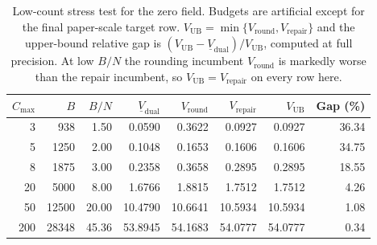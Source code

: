 \begin{table}[t]\centering\small
\caption{Low-count stress test for the zero field. Budgets are artificial except
for the final paper-scale target row. $V_{\mathrm{UB}}=\min\{V_{\mathrm{round}},
V_{\mathrm{repair}}\}$ and the upper-bound relative gap is
$(V_{\mathrm{UB}}-\underline V_{\mathrm{dual}})/V_{\mathrm{UB}}$, computed at full
precision. At low $B/N$ the rounding incumbent $V_{\mathrm{round}}$ is markedly
worse than the repair incumbent, so $V_{\mathrm{UB}}=V_{\mathrm{repair}}$ on every
row here.}
\label{tab:cmax-ablation}
\begin{tabular}{rrrrrrrr}
\toprule
$C_{\max}$ & $B$ & $B/N$ & $\underline V_{\mathrm{dual}}$ & $V_{\mathrm{round}}$ &
$V_{\mathrm{repair}}$ & $V_{\mathrm{UB}}$ & Gap (\%)\\
\midrule
  3 &   938 &  1.50 &  0.0590 &  0.3622 &  0.0927 &  0.0927 & 36.34\\
  5 &  1250 &  2.00 &  0.1048 &  0.1653 &  0.1606 &  0.1606 & 34.75\\
  8 &  1875 &  3.00 &  0.2358 &  0.3658 &  0.2895 &  0.2895 & 18.55\\
 20 &  5000 &  8.00 &  1.6766 &  1.8815 &  1.7512 &  1.7512 &  4.26\\
 50 & 12500 & 20.00 & 10.4790 & 10.6641 & 10.5934 & 10.5934 &  1.08\\
200 & 28348 & 45.36 & 53.8945 & 54.1683 & 54.0777 & 54.0777 &  0.34\\
\bottomrule
\end{tabular}
\end{table}

